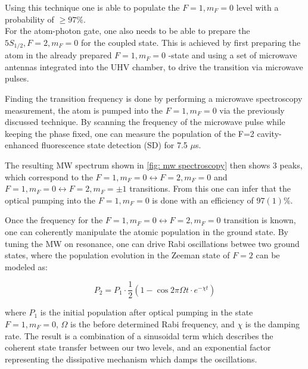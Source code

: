 
Using this technique one is able to populate the $F=1,m_F=0$ level with a probability of $\geq97\%$.\cite{GianvitoC2026}\\

For the atom-photon gate, one also needs to be able to prepare the $5 S_{1/2}, F=2, m_F = 0$ for the coupled state. This is achieved by first preparing the atom in the already prepared $F=1, m_F=0$ -state and using a set of microwave antennas integrated into the UHV chamber, to drive the transition via microwave pulses.

Finding the transition frequency is done by performing a microwave spectroscopy measurement, the atom is pumped into the $F=1, m_F=0$ via the previously discussed technique. By scanning the frequency of the microwave pulse while keeping the phase fixed, one can measure the population of the F=2 cavity-enhanced fluorescence state detection (SD) for 7.5 $\mu$s.

The resulting MW spectrum shown in \ref{fig: mw spectroscopy} then shows 3 peaks, which correspond to the $F=1, m_F=0 \leftrightarrow F=2,m_F=0$ and $F=1,m_F=0\leftrightarrow F=2,m_F=\pm1$ transitions. From this one can infer that the optical pumping into the $F=1,m_F=0$ is done with an efficiency of $97(1)\%$.\cite{GianvitoC2026}


Once the frequency for the $F=1,m_F=0 \leftrightarrow F=2,m_F=0$ transition is known, one can coherently manipulate the atomic population in the ground state. By tuning the MW on resonance, one can drive Rabi oscillations \cite{OpticalResonanceAndTwoLevelAtoms} betwee two ground states, where the population evolution in the Zeeman state of $F=2$ can be modeled as:\cite{RabiOscillationModel}

\begin{equation}
	P_2=P_1\cdot\frac{1}{2}(1-\cos{2\pi\Omega t}\cdot e^{-\chi t})
	\label{eq:rabi_oscillation_model}
\end{equation}

where $P_1$ is the initial population after optical pumping in the state $F=1,m_F=0$, $\Omega$ is the before determined Rabi frequency, and $\chi$ is the damping rate. The result is a combination of a sinusoidal term which describes the coherent state transfer between our two levels, and an exponential factor representing the dissipative mechanism which damps the oscillations.

